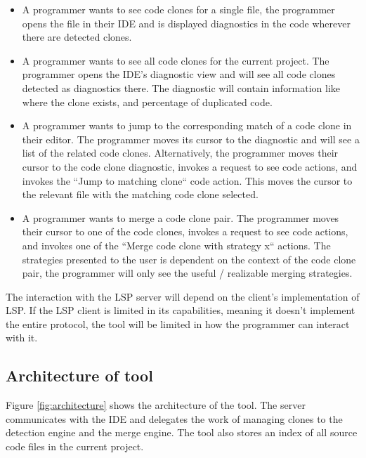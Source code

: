 \documentclass[12pt]{article}
\begin{document}
\begin{itemize}
	\item A programmer wants to see code clones for a single file, the
	      programmer opens the file in their IDE and is displayed diagnostics in the code
	      wherever there are detected clones.

	\item A programmer wants to see all code clones for the current project. The
	      programmer opens the IDE's diagnostic view and will see all code clones detected
	      as diagnostics there. The diagnostic will contain information like where the clone
	      exists, and percentage of duplicated code.

	\item A programmer wants to jump to the corresponding match of a code clone in their
	      editor. The programmer moves its cursor to the diagnostic and will see a list of
	      the related code clones. Alternatively, the programmer moves their cursor to the
	      code clone diagnostic, invokes a request to see code actions, and invokes the
	      ``Jump to matching clone`` code action. This moves the cursor to the relevant file
	      with the matching code clone selected.

	\item A programmer wants to merge a code clone pair. The programmer moves their cursor
	      to one of the code clones, invokes a request to see code actions, and invokes one
	      of the ``Merge code clone with strategy x`` actions. The strategies presented to
	      the user is dependent on the context of the code clone pair, the programmer will
	      only see the useful / realizable merging strategies.
\end{itemize}

The interaction with the LSP server will depend on the client's implementation of LSP. If
the LSP client is limited in its capabilities, meaning it doesn't implement the entire
protocol, the tool will be limited in how the programmer can interact with it.

\subsection{Architecture of tool}

Figure \ref{fig:architecture} shows the architecture of the tool. The server communicates
with the IDE and delegates the work of managing clones to the detection engine and the
merge engine. The tool also stores an index of all source code files in the current project.
\end{document}
